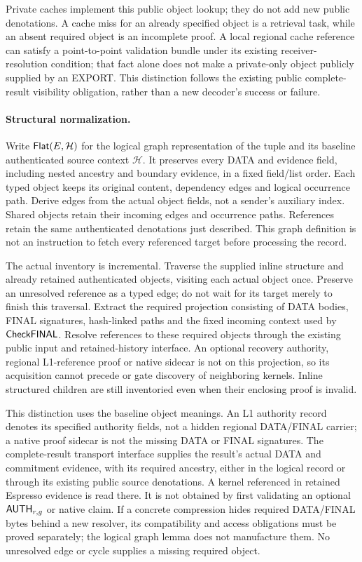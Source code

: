 Private caches implement this public object lookup; they do not add
new public denotations. A cache miss for an already specified object is
a retrieval task, while an absent required object is an incomplete
proof. A local regional cache reference can satisfy a point-to-point
validation bundle under its existing receiver-resolution condition;
that fact alone does not make a private-only object publicly supplied
by an EXPORT. This distinction follows the existing public
complete-result visibility obligation, rather than a new decoder's
success or failure.

\paragraph{Structural normalization.}
Write $\mathsf{Flat}(E,\mathcal H)$ for the logical graph representation
of the tuple and its baseline authenticated source context $\mathcal H$.
It preserves every DATA and evidence field, including nested ancestry
and boundary evidence, in a fixed field/list order. Each typed object
keeps its original content, dependency edges and logical occurrence
path. Derive edges from the actual object fields, not a sender's
auxiliary index. Shared objects retain their incoming edges and
occurrence paths. References retain the same authenticated denotations
just described. This graph definition is not an instruction to fetch
every referenced target before processing the record.

The actual inventory is incremental. Traverse the supplied inline
structure and already retained authenticated objects, visiting each
actual object once. Preserve an unresolved reference as a typed edge;
do not wait for its target merely to finish this traversal. Extract
the required projection consisting of DATA bodies, FINAL signatures,
hash-linked paths and the fixed incoming context used by
$\mathsf{CheckFINAL}$. Resolve references to these required objects through
the existing public input and retained-history interface. An optional
recovery authority, regional L1-reference proof or native sidecar is
not on this projection, so its acquisition cannot precede or gate
discovery of neighboring kernels. Inline structured children are still
inventoried even when their enclosing proof is invalid.

This distinction uses the baseline object meanings. An L1 authority
record denotes its specified authority fields, not a hidden regional
DATA/FINAL carrier; a native proof sidecar is not the missing DATA or
FINAL signatures. The complete-result transport interface supplies
the result's actual DATA and commitment evidence, with its required
ancestry, either in the logical record or through its existing public
source denotations. A kernel referenced in retained Espresso evidence
is read there. It is not obtained by first validating an optional
$\mathsf{AUTH}_{r,g}$ or native claim. If a concrete compression hides
required DATA/FINAL bytes behind a new resolver, its compatibility and
access obligations must be proved separately; the logical graph lemma
does not manufacture them. No unresolved edge or cycle supplies a
missing required object.

